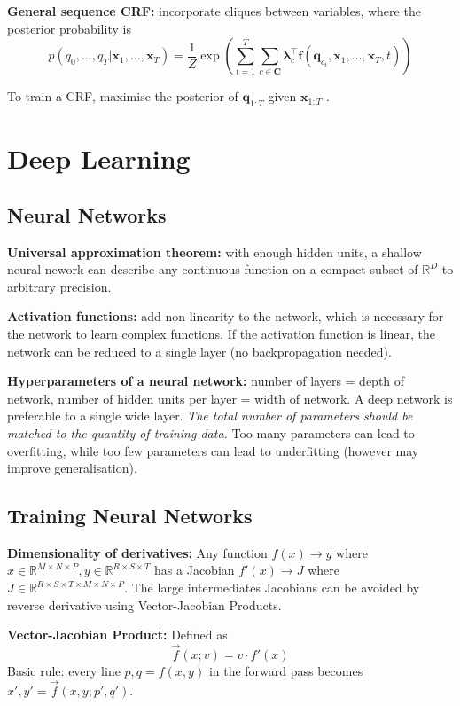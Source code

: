 \documentclass[12pt]{article}
\begin{document}
\textbf{General sequence CRF:} incorporate cliques between variables, where the posterior probability is
$$
p(q_0, \dots, q_T | \boldsymbol{x}_1, \dots, \boldsymbol{x}_T) = \frac{1}{Z} \exp\left(\sum_{t=1}^T \sum_{c \in \boldsymbol{C}} \boldsymbol{\lambda}_c^\top \boldsymbol{f}(\boldsymbol{q}_{c_t}, \boldsymbol{x}_1, \dots, \boldsymbol{x}_T, t)\right)
$$

To train a CRF, maximise the posterior of $\boldsymbol{q}_{1:T}$ given $\boldsymbol{x}_{1:T}$ .

\section{Deep Learning}
\subsection{Neural Networks}
\textbf{Universal approximation theorem:} with enough hidden units, a shallow neural nework can describe any continuous function on a compact subset of $\mathbb{R}^D$ to arbitrary precision.

\textbf{Activation functions:} add non-linearity to the network, which is necessary for the network to learn complex functions. If the activation function is linear, the network can be reduced to a single layer (no backpropagation needed).

\textbf{Hyperparameters of a neural network:} number of layers = depth of network, number of hidden units per layer = width of network. A deep network is preferable to a single wide layer. 
\textit{The total number of parameters should be matched to the quantity of training data.} Too many parameters can lead to overfitting, while too few parameters can lead to underfitting (however may improve generalisation).

\subsection{Training Neural Networks}
\textbf{Dimensionality of derivatives:} Any function $f(x) \to y$ where $x \in \mathbb{R}^{M\times N \times P}, y \in \mathbb{R}^{R\times S \times T}$ has a Jacobian $f'(x) \to J$ where $J \in \mathbb{R}^{R\times S \times T \times M \times N \times P}$. The large intermediates Jacobians can be avoided by reverse derivative using Vector-Jacobian Products.

\textbf{Vector-Jacobian Product:}
Defined as 
$$\vec{f}(x; v) = v \cdot f'(x)$$
Basic rule: every line
$p, q = f(x, y)$ in the forward pass becomes $x', y' = \vec{f}(x, y; p', q')$.
\end{document}
